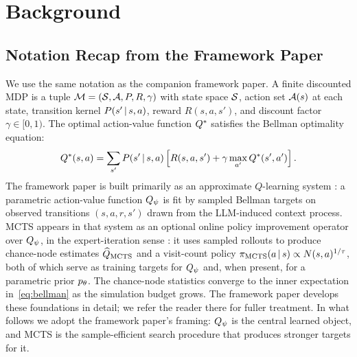\section{Background}
\label{sec:background}


\subsection{Notation Recap from the Framework Paper}
\label{sec:background-recap}

We use the same notation as the companion framework paper. A finite
discounted MDP is a tuple $\mathcal{M} = (\mathcal{S}, \mathcal{A}, P, R, \gamma)$ with
state space $\mathcal{S}$, action set $\mathcal{A}(s)$ at each state, transition
kernel $P(s' \,|\, s, a)$, reward $R(s, a, s')$, and discount factor
$\gamma \in [0, 1)$. The optimal action-value function $Q^{\ast}$
satisfies the Bellman optimality equation:
\begin{equation}
Q^{\ast}(s, a)
= \sum_{s'} P(s' \,|\, s, a)
  \left[ R(s, a, s') + \gamma \max_{a'} Q^{\ast}(s', a') \right].
\label{eq:bellman}
\end{equation}
The framework paper is built primarily as an approximate $Q$-learning
system \citep{sutton2018reinforcement, mnih2015human}: a parametric
action-value function $Q_{\psi}$ is fit by sampled Bellman targets on
observed transitions $(s, a, r, s')$ drawn from the LLM-induced
context process. MCTS appears in that system as an optional online
policy improvement operator over $Q_{\psi}$, in the expert-iteration
sense \citep{anthony2017thinking, silver2017alphagozero,
silver2018alphazero}: it uses sampled rollouts to produce
chance-node estimates $\widehat{Q}_{\mathrm{MCTS}}$ and a visit-count policy
$\pi_{\mathrm{MCTS}}(a \,|\, s) \propto N(s, a)^{1/\tau}$, both of which serve as
training targets for $Q_{\psi}$ and, when present, for a parametric prior
$p_{\theta}$. The chance-node statistics converge to the inner
expectation in~\eqref{eq:bellman} as the simulation budget grows. The
framework paper develops these foundations in detail; we refer the
reader there for fuller treatment. In what follows we adopt the
framework paper's framing: $Q_{\psi}$ is the central learned object, and
MCTS is the sample-efficient search procedure that produces stronger
targets for it.

